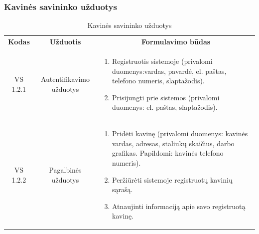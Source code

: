 \documentclass{VUMIFPSkursinis}
\begin{document}
\subsubsection{Kavinės savininko užduotys}
\begin{center}
	\begin{table}[H]
	\begin{tabular}{|p{2cm}|p{}|p{}|}
	\hline
	    \rowcolor{lightgray}
		\multicolumn{3}{|c|}{Kavinės savininko užduotys}\\
		
	\hline
		\multicolumn{1}{|c|}{{\bfseries Kodas}}&
		\multicolumn{1}{|c|}{{\bfseries Užduotis}}&
		\multicolumn{1}{|c|}{{\bfseries Formulavimo būdas}}\\		
	\hline
		\multicolumn{1}{|c|}{VS 1.2.1}&  	
		\multicolumn{1}{|c|}{Autentifikavimo užduotys}&
		{
			\begin{enumerate}
				\item Registruotis sistemoje (privalomi duomenys:vardas, pavardė, el. paštas, telefono numeris, slaptažodis).
				\item Prisijungti prie sistemos (privalomi duomenys: el. paštas, slaptažodis).
			\end{enumerate}}\\
	\hline
		\multicolumn{1}{|c|}{VS 1.2.2}&
		\multicolumn{1}{|c|}{Pagalbinės užduotys}&
		{
			\begin{enumerate}
				\item Pridėti kavinę (privalomi duomenys: kavinės vardas, adresas, staliukų skaičius, darbo grafikas. Papildomi: kavinės telefono numeris).
				\item Peržiūrėti sistemoje registruotų kavinių sąrašą.
				\item Atnaujinti informaciją apie savo registruotą kavinę.
			\end{enumerate}}\\
	
	\hline 	 	
	\end{tabular}
	\caption{Kavinės savininko užduotys}
	\label{table:2}
	\end{table}

\end{center}
\end{document}
